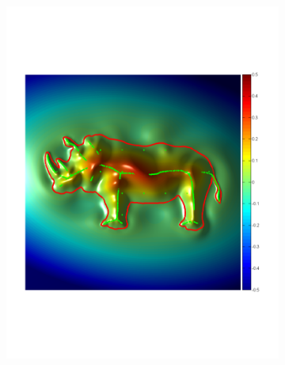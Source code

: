 \documentclass[annual]{acmsiggraph}
\begin{document}
\begin{figure}
\begin{subfigure}[b]{0.33\linewidth}
                \includegraphics[width=\textwidth]{images/rhenoceros/2.pdf}
        \end{subfigure}
~
		\begin{subfigure}[b]{0.3\linewidth}
                \centering

\end{subfigure}
\end{figure}
\end{document}
